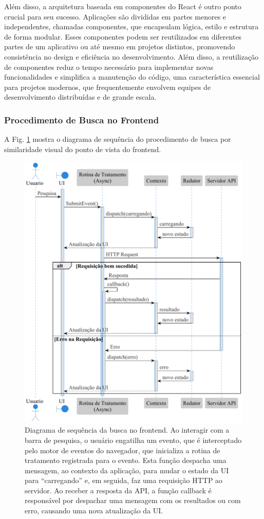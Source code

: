 Além disso, a arquitetura baseada em componentes do React é outro ponto crucial para seu sucesso. Aplicações são divididas em partes menores e independentes, chamadas componentes, que encapsulam lógica, estilo e estrutura de forma modular. Esses componentes podem ser reutilizados em diferentes partes de um aplicativo ou até mesmo em projetos distintos, promovendo consistência no design e eficiência no desenvolvimento. Além disso, a reutilização de componentes reduz o tempo necessário para implementar novas funcionalidades e simplifica a manutenção do código, uma característica essencial para projetos modernos, que frequentemente envolvem equipes de desenvolvimento distribuídas e de grande escala.


\subsubsection{Procedimento de Busca no Frontend}
\label{sec:si-front-busca}

A Fig. \ref{fig:seq-front} mostra o diagrama de sequência do procedimento de busca por similaridade visual do ponto de vista do frontend.

\begin{figure}[!ht]
  \centering
  \includegraphics[width=0.9\linewidth]{diagrams/plots/sequence_front.pdf}
  \caption{Diagrama de sequência da busca no frontend. Ao interagir com a barra de pesquisa, o usuário engatilha um evento, que é interceptado pelo motor de eventos do navegador, que inicializa a rotina de tratamento registrada para o evento. Esta função despacha uma mensagem, ao contexto da aplicação, para mudar o estado da UI para ``carregando'' e, em seguida, faz uma requisição HTTP ao servidor. Ao receber a resposta da API, a função callback é responsável por despachar uma mensagem com os resultados ou com erro, causando uma nova atualização da UI.}
  \label{fig:seq-front}
\end{figure}



